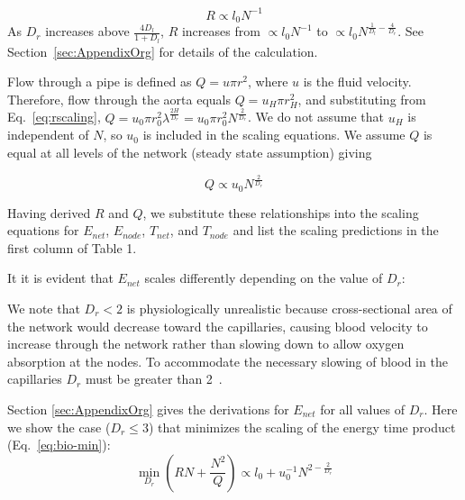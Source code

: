 \documentclass[12pt]{article}
\begin{document}
\begin{equation}
R \propto l_0 N^{-1} 
\end {equation}
As
$D_r$ increases above $\frac{4D_l}{1+D_l}$, $R$ increases from $\propto l_0 N^{-1}$ to $\propto
l_0 N^{\frac{1}{D_l} - \frac{4}{D_r}}$. 
See Section~\ref{sec:AppendixOrg} for details of the calculation.

Flow through a pipe is defined as $Q = u\pi r^2$, where $u$ is the fluid
velocity. 
Therefore, flow through the aorta equals $Q = u_H \pi r_{H}^2$, and
substituting from Eq.~\ref{eq:rscaling}, $Q = u_0 \pi r_0^2
\lambda^{\frac{2H}{D_r}} = u_0 \pi r_0^2N^{\frac{2}{D_r}} $.  We do not assume
that $u_H$ is independent of $N$, so $u_0$ is included in the scaling
equations.  We assume $Q$ is equal at all levels of the network (steady state
assumption) giving

\begin{equation}
Q \propto u_0 N^{\frac{2}{D_r}}
\end{equation}


Having derived $R$ and $Q$, we substitute these relationships into the scaling equations for $E_{net}$, $E_{node}$, $T_{net}$, and $T_{node}$ and list the scaling predictions in the first column of Table 1.

It it is evident that $E_{net}$ scales differently depending on the value of $D_r$:

\begin{caseof}

\end{caseof}
\noindent We note that $D_r < 2$ is physiologically unrealistic because cross-sectional area of the network would decrease toward the capillaries, causing blood velocity to increase through the network
rather than slowing down to allow oxygen absorption at the nodes. To
accommodate the necessary slowing of blood in the capillaries $D_r$ must be
greater than 2~\cite{west97}.

Section \ref{sec:AppendixOrg} gives the derivations for $E_{net}$
for all values of $D_r$. Here we show the case ($D_r \leq 3$) that minimizes
the scaling of the energy time product (Eq.~\ref{eq:bio-min}):
\begin{equation}
  \min_{D_r} (RN + \frac{N^2}{Q})
  \propto l_0 + u_0^{-1}N^{2-\frac{2}{D_r}}
\label{eq:bio-min2}
\end{equation}
\end{document}

